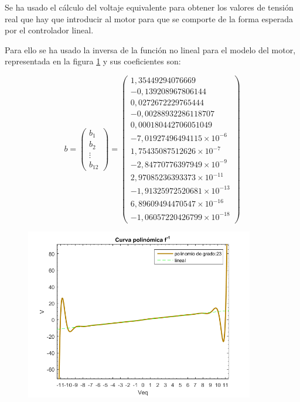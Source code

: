 \documentclass[a4paper]{article}
\begin{document}
Se ha usado el cálculo del voltaje equivalente para obtener los valores de tensión real que hay que introducir al motor para que se comporte de la forma esperada por el
controlador lineal.

Para ello se ha usado la inversa de la función no lineal para el modelo del motor, representada en la figura \ref{polinomioB} y sus coeficientes son:

\begin{equation}
b =
\left( \begin{array}{c}
b_1 \\
b_2 \\
\vdots \\
b_12
\end{array} \right)
=
\left( \begin{array}{c}
1,35449294076669 \\
-0,139208967806144 \\
0,0272672229765444 \\
-0,00288932286118707 \\
0,000180442706051049 \\
-7,01927496494115\times 10^{-6} \\
1,75435087512626\times 10^{-7} \\
-2,84770776397949\times 10^{-9} \\
2,97085236393373\times 10^{-11} \\
-1,91325972520681\times 10^{-13} \\
6,89609494470547\times 10^{-16} \\
-1,06057220426799\times 10^{-18}

\end{array} \right)
\end{equation}

\begin{figure}[htbp]
	\begin{center}
		\includegraphics[width=10cm]{curva_polinomica_inversa}
		\caption{}
		\label{polinomioB}
	\end{center}
\end{figure}
\end{document}
